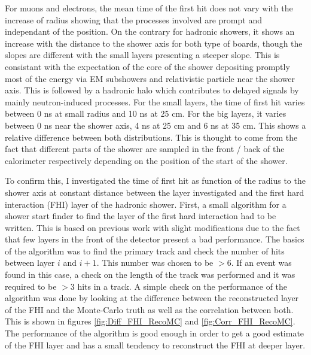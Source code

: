 For muons and electrons, the mean time of the first hit does not vary with the increase of radius showing that the processes involved are prompt and independant of the position. On the contrary for hadronic showers, it shows an increase with the distance to the shower axis for both type of boards, though the slopes are different with the small layers presenting a steeper slope. This is consistant with the expectation of the core of the shower depositing promptly most of the energy via EM subshowers and relativistic particle near the shower axis. This is followed by a hadronic halo which contributes to delayed signals by mainly neutron-induced processes. For the small layers, the time of first hit varies between 0 ns at small radius and 10 ns at 25 cm. For the big layers, it varies between 0 ns near the shower axis, 4 ns at 25 cm and 6 ns at 35 cm. This shows a relative difference between both distributions. This is thought to come from the fact that different parts of the shower are sampled in the front / back of the calorimeter respectively depending on the position of the start of the shower.

To confirm this, I investigated the time of first hit as function of the radius to the shower axis at constant distance between the layer investigated and the first hard interaction (FHI) layer of the hadronic shower. First, a small algorithm for a shower start finder to find the layer of the first hard interaction had to be written. This is based on previous work \cite{CaN026} with slight modifications due to the fact that few layers in the front of the detector present a bad performance. The basics of the algorithm was to find the primary track and check the number of hits between layer $i$ and $i+1$. This number was chosen to be $>6$. If an event was found in this case, a check on the length of the track was performed and it was required to be $>3$ hits in a track. A simple check on the performance of the algorithm was done by looking at the difference between the reconstructed layer of the FHI and the Monte-Carlo truth as well as the correlation between both. This is shown in figures \ref{fig:Diff_FHI_RecoMC} and \ref{fig:Corr_FHI_RecoMC}. The performance of the algorithm is good enough in order to get a good estimate of the FHI layer and has a small tendency to reconstruct the FHI at deeper layer.

